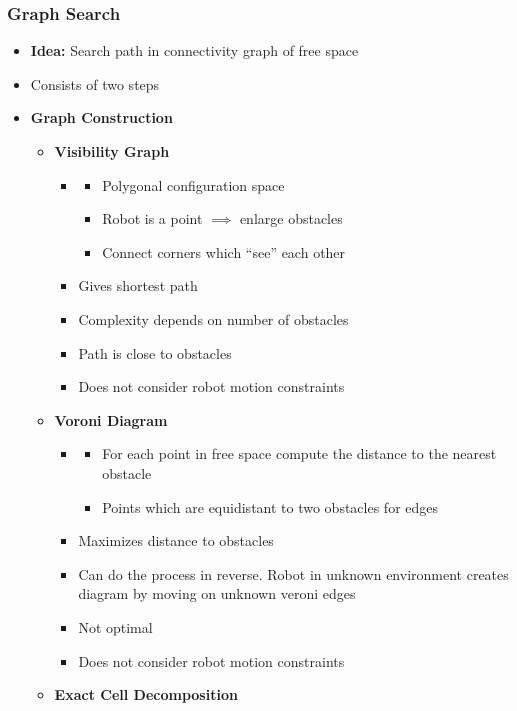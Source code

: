 \documentclass[a4paper]{article}
\newcommand{\ipro}{\item[+]}
\newcommand{\icon}{\item[-]}
\newcommand{\ides}[1]{\item \textbf{#1}}
\begin{document}
\subsubsection{Graph Search}
\begin{itemize}
    \ides{Idea:} Search path in connectivity graph of free space
    \item Consists of two steps
    \item[1)] \textbf{Graph Construction}
        \begin{itemize}
            \ides{Visibility Graph}
                \begin{itemize}
                    \item
                        \begin{itemize}
                            \item Polygonal configuration space
                            \item Robot is a point $\implies$ enlarge obstacles
                            \item Connect corners which ``see'' each other
                        \end{itemize}
                    \ipro Gives shortest path
                    \icon Complexity depends on number of obstacles
                    \icon Path is close to obstacles
                    \icon Does not consider robot motion constraints
                \end{itemize}
            \ides{Voroni Diagram}
                \begin{itemize}
                    \item
                        \begin{itemize}
                            \item For each point in free space compute the distance to the nearest obstacle
                            \item Points which are equidistant to two obstacles for edges
                        \end{itemize}
                    \ipro Maximizes distance to obstacles
                    \ipro Can do the process in reverse. Robot in unknown environment creates diagram by moving on unknown veroni edges
                    \icon Not optimal
                    \icon Does not consider robot motion constraints
                \end{itemize}
            \ides{Exact Cell Decomposition}
                \begin{itemize}

\end{itemize}
\end{itemize}
\end{itemize}
\end{document}
